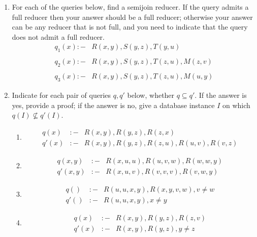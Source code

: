 \documentclass[12pt]{article}
\newcounter{query}
\begin{document}
\begin{enumerate}

\item For each of the queries below, find a semijoin reducer.  If the
  query admits a full reducer then your answer should be a full
  reducer; otherwise your answer can be any reducer that is not full,
  and you need to indicate that the query does not admit a full
  reducer.
  \begin{align*}
    q_1(x) :- & R(x,y), S(y,z), T(y,u) \\
    \\
    q_2(x) :- & R(x,y), S(y,z), T(z,u), M(z,v) \\
    \\
    q_3(x) :- & R(x,y), S(y,z), T(z,u), M(u,y)
  \end{align*}


\item Indicate for each pair of queries $q, q'$ below, whether $q
  \subseteq q'$.  If the answer is yes, provide a proof; if the answer
  is no, give a database instance $I$ on which $q(I) \not\subseteq
  q'(I)$.

  \begin{enumerate}
  \item
    \begin{eqnarray*}
      q(x)  & :- & R(x,y), R(y,z), R(z,x) \\
      q'(x) & :- & R(x,y), R(y,z), R(z,u), R(u,v), R(v,z)
    \end{eqnarray*}

  \item
    \begin{eqnarray*}
      q(x,y) & :- & R(x,u,u), R(u,v,w), R(w,w,y) \\
      q'(x,y) & :- & R(x,u,v), R(v,v,v), R(v,w,y)
    \end{eqnarray*}

  \item
    \begin{eqnarray*}
      q() &  :- & R(u,u,x,y),R(x,y,v,w),v\not=w \\
      q'() & :- & R(u,u,x,y), x\not=y
    \end{eqnarray*}

  \item
    \begin{eqnarray*}
      q(x) & :- & R(x,y), R(y,z),R(z,v) \\
      q'(x) & :- & R(x,y), R(y,z), y\not=z
    \end{eqnarray*}


\end{enumerate}
\end{enumerate}
\end{document}
